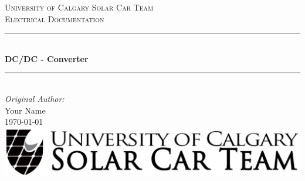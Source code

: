   \begin{titlepage}
  
    \newcommand{\HRule}{\rule{\linewidth}{0.5mm}} %
    
    \center %
     
    
    \textsc{\LARGE University of Calgary Solar Car Team}\\[1.5cm] %
    \textsc{\Large Electrical Documentation}\\[0.5cm] %
    
    
    \HRule \\[0.4cm]
      { \huge \bfseries DC/DC - Converter}\\[0.4cm] %
    \HRule \\[1.5cm]
     
    
    \Large \emph{Original Author:}\\
    Your Name \\[3cm] %
    
    
    {\large \today}\\[2cm] %
    
    
    \includegraphics[width=\textwidth]{../Images/Logos/logo-wide.png}\\[1cm] %
     

\end{titlepage}
